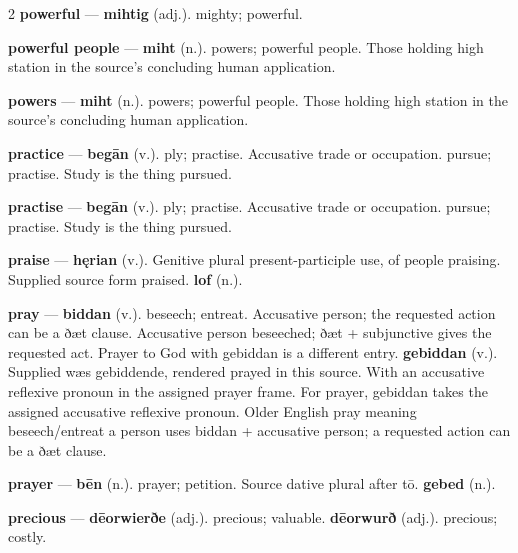 \begin{multicols}{2}
\textbf{powerful} — \textbf{mihtig} (adj.). mighty; powerful.\par
\textbf{powerful people} — \textbf{miht} (n.). powers; powerful people. Those holding high station in the source's concluding human application.\par
\textbf{powers} — \textbf{miht} (n.). powers; powerful people. Those holding high station in the source's concluding human application.\par
\textbf{practice} — \textbf{begān} (v.). ply; practise. Accusative trade or occupation. pursue; practise. Study is the thing pursued.\par
\textbf{practise} — \textbf{begān} (v.). ply; practise. Accusative trade or occupation. pursue; practise. Study is the thing pursued.\par
\textbf{praise} — \textbf{hęrian} (v.). Genitive plural present-participle use, of people praising. Supplied source form praised. \textbf{lof} (n.).\par
\textbf{pray} — \textbf{biddan} (v.). beseech; entreat. Accusative person; the requested action can be a ðæt clause. Accusative person beseeched; ðæt + subjunctive gives the requested act. Prayer to God with gebiddan is a different entry. \textbf{gebiddan} (v.). Supplied wæs gebiddende, rendered prayed in this source. With an accusative reflexive pronoun in the assigned prayer frame. For prayer, gebiddan takes the assigned accusative reflexive pronoun. Older English pray meaning beseech/entreat a person uses biddan + accusative person; a requested action can be a ðæt clause.\par
\textbf{prayer} — \textbf{bēn} (n.). prayer; petition. Source dative plural after tō. \textbf{gebed} (n.).\par
\textbf{precious} — \textbf{dēorwierðe} (adj.). precious; valuable. \textbf{dēorwurð} (adj.). precious; costly.\par

\end{multicols}
